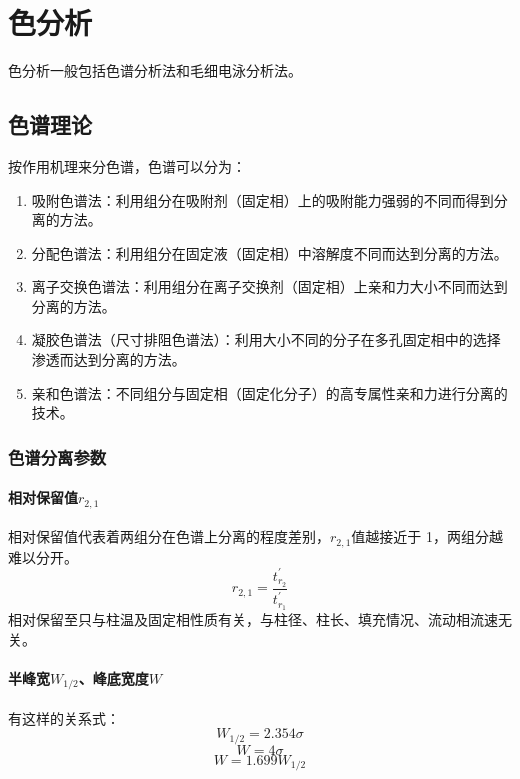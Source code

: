 \documentclass[UTF8,AutoFakeBold,b5paper]{ctexbook}
\begin{document}
\chapter{色分析}
色分析一般包括色谱分析法和毛细电泳分析法。
\section{色谱理论}
按作用机理来分色谱，色谱可以分为：
\begin{enumerate}
	\item \textcolor[rgb]{0.54,0.13,0.33}{吸附色谱法}：利用组分在吸附剂（固定相）上的吸附能力强弱的不同而得到分离的方法。
	\item \textcolor[rgb]{0.54,0.13,0.33}{分配色谱法}：利用组分在固定液（固定相）中溶解度不同而达到分离的方法。
	\item \textcolor[rgb]{0.54,0.13,0.33}{离子交换色谱法}：利用组分在离子交换剂（固定相）上亲和力大小不同而达到分离的方法。
	\item \textcolor[rgb]{0.54,0.13,0.33}{凝胶色谱法（尺寸排阻色谱法）}：利用大小不同的分子在多孔固定相中的选择渗透而达到分离的方法。
	\item \textcolor[rgb]{0.54,0.13,0.33}{亲和色谱法}：不同组分与固定相（固定化分子）的高专属性亲和力进行分离的技术。
\end{enumerate}
\subsection{色谱分离参数}
\subsubsection{相对保留值$r_{2,1}$}
相对保留值代表着两组分在色谱上分离的程度差别，\textcolor[rgb]{0.54,0.13,0.33}{$r_{2,1}$值越接近于 1，两组分越难以分开}。
\begin{equation}
	r_{2,1} = \dfrac{t_{r_{2}}^{'}}{t_{r_{1}}^{'}}
\end{equation}
相对保留至只与柱温及固定相性质有关，与柱径、柱长、填充情况、流动相流速无关。
\subsubsection{半峰宽$W_{1/2}$、峰底宽度$W$}
有这样的关系式：
\begin{equation}
	W_{1/2} = 2.354\sigma
\end{equation}
\begin{equation}
	W = 4\sigma
\end{equation}
\begin{equation}
	W = 1.699W_{1/2}
\end{equation}
\end{document}
